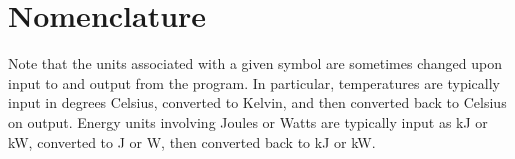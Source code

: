 \documentclass[12pt,twoside]{book}
\begin{document}


\appendix
{}

%
%

\chapter{Nomenclature}
\label{nomenclature}

Note that the units associated with a given symbol are sometimes changed upon input to and output from the program. In particular, temperatures are typically input in degrees Celsius, converted to Kelvin, and then converted back to Celsius on output. Energy units involving Joules or Watts are typically input as kJ or kW, converted to J or W, then converted back to kJ or kW.
\end{document}
